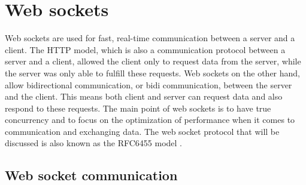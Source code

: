 \documentclass[a4paper, 11pt]{report}
\begin{document}
\section{Web sockets}
Web sockets are used for fast, real-time communication between a server and a client. The HTTP model, which is also a communication protocol between a server and a client, allowed the client only to request data from the server, while the server was only able to fulfill these requests. Web sockets on the other hand, allow bidirectional communication, or bidi communication, between the server and the client. This means both client and server can request data and also respond to these requests. The main point of web sockets is to have true concurrency and to focus on the optimization of performance when it comes to communication and exchanging data. The web socket protocol that will be discussed is also known as the RFC6455 model \cite{RFC6455}.

	\subsection{Web socket communication}
\end{document}
